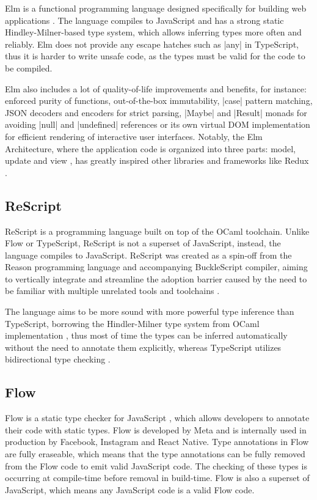 Elm is a functional programming language designed specifically for building web applications \cite{ElmDelightfulLanguage}. The language compiles to JavaScript and has a strong static Hindley-Milner-based type system, which allows inferring types more often and reliably. Elm does not provide any escape hatches such as \code|any| in TypeScript, thus it is harder to write unsafe code, as the types must be valid for the code to be compiled.

Elm also includes a lot of quality-of-life improvements and benefits, for instance: enforced purity of functions, out-of-the-box immutability, \code|case| pattern matching, JSON decoders and encoders for strict parsing, \code|Maybe| and \code|Result| monads for avoiding \code|null| and \code|undefined| references or its own virtual DOM implementation for efficient rendering of interactive user interfaces. Notably, the Elm Architecture, where the application code is organized into three parts: model, update and view \cite{ElmArchitectureIntroduction}, has greatly inspired other libraries and frameworks like Redux \cite{PriorArtRedux2022}.

\subsection{ReScript}

ReScript is a programming language built on top of the OCaml toolchain. Unlike Flow or TypeScript, ReScript is not a superset of JavaScript, instead, the language compiles to JavaScript. ReScript was created as a spin-off from the Reason programming language and accompanying BuckleScript compiler, aiming to vertically integrate and streamline the adoption barrier caused by the need to be familiar with multiple unrelated tools and toolchains \cite{BuckleScriptReasonRebranding}.

The language aims to be more sound with more powerful type inference than TypeScript, borrowing the Hindler-Milner type system from OCaml implementation \cite{EfficientInsightfulGeneralization,HistoryReScript2022}, thus most of time the types can be inferred automatically without the need to annotate them explicitly, whereas TypeScript utilizes bidirectional type checking \cite{ReconstructingTypeScriptPart}.

\subsection{Flow}

Flow is a static type checker for JavaScript \cite{chaudhuriFastPreciseType2017,Flow2023}, which allows developers to annotate their code with static types. Flow is developed by Meta and is internally used in production by Facebook, Instagram and React Native. Type annotations in Flow are fully eraseable, which means that the type annotations can be fully removed from the Flow code to emit valid JavaScript code. The checking of these types is occurring at compile-time before removal in build-time. Flow is also a superset of JavaScript, which means any JavaScript code is a valid Flow code.

